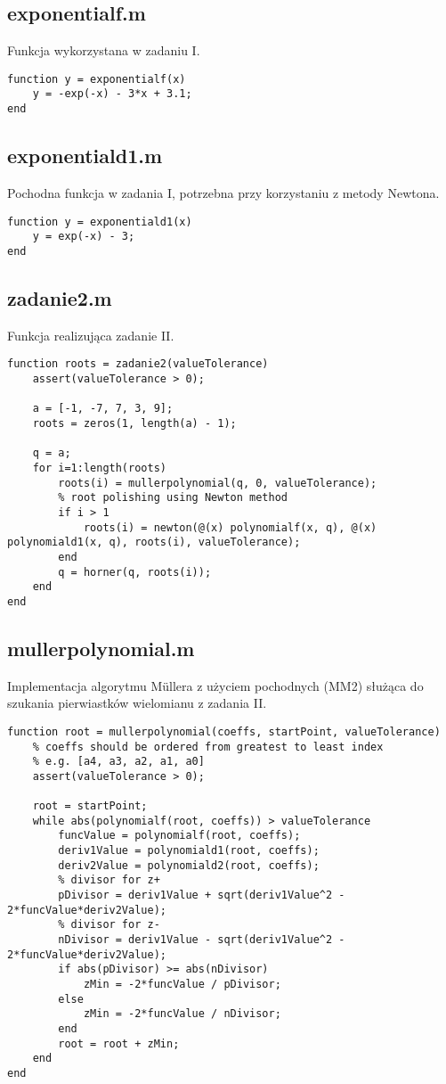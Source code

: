 \documentclass[12pt]{article}
\begin{document}
\subsection{exponentialf.m}
Funkcja wykorzystana w zadaniu I.
\begin{verbatim}
function y = exponentialf(x)
    y = -exp(-x) - 3*x + 3.1;
end
\end{verbatim}

\subsection{exponentiald1.m}
Pochodna funkcja w zadania I, potrzebna przy korzystaniu z metody Newtona.
\begin{verbatim}
function y = exponentiald1(x)
    y = exp(-x) - 3;
end
\end{verbatim}

\subsection{zadanie2.m}
Funkcja realizująca zadanie II.
\begin{verbatim}
function roots = zadanie2(valueTolerance)
    assert(valueTolerance > 0);

    a = [-1, -7, 7, 3, 9];
    roots = zeros(1, length(a) - 1);

    q = a;
    for i=1:length(roots)
        roots(i) = mullerpolynomial(q, 0, valueTolerance);
        % root polishing using Newton method
        if i > 1
            roots(i) = newton(@(x) polynomialf(x, q), @(x) polynomiald1(x, q), roots(i), valueTolerance);
        end
        q = horner(q, roots(i));
    end
end
\end{verbatim}

\subsection{mullerpolynomial.m}
Implementacja algorytmu Müllera z użyciem pochodnych (MM2) służąca do szukania pierwiastków wielomianu z zadania II.
\begin{verbatim}
function root = mullerpolynomial(coeffs, startPoint, valueTolerance)
    % coeffs should be ordered from greatest to least index
    % e.g. [a4, a3, a2, a1, a0]
    assert(valueTolerance > 0);

    root = startPoint;
    while abs(polynomialf(root, coeffs)) > valueTolerance
        funcValue = polynomialf(root, coeffs);
        deriv1Value = polynomiald1(root, coeffs);
        deriv2Value = polynomiald2(root, coeffs);
        % divisor for z+
        pDivisor = deriv1Value + sqrt(deriv1Value^2 - 2*funcValue*deriv2Value);
        % divisor for z-
        nDivisor = deriv1Value - sqrt(deriv1Value^2 - 2*funcValue*deriv2Value);
        if abs(pDivisor) >= abs(nDivisor)
            zMin = -2*funcValue / pDivisor;
        else
            zMin = -2*funcValue / nDivisor;
        end
        root = root + zMin;
    end
end
\end{verbatim}
\end{document}
